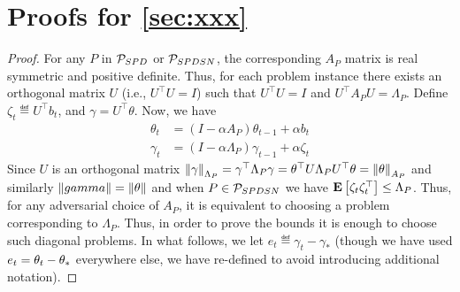 \section{Proofs for \cref{sec:xxx}}

\thpspd*
\begin{proof}
For any $P$ in $\P_{SPD}$ or $\P_{SPDSN}$, the corresponding $A_P$ matrix is real symmetric and positive definite. Thus, for each problem instance there exists an orthogonal matrix $U$ (i.e., $U^\top U=I$) such that $U^\top U=I$ and $U^\top A_P U=\Lambda_P$. Define $\zeta_t\eqdef U^\top b_t$, and $\gamma=U^\top \theta$. Now, we have
\begin{align}
\theta_t&=(I-\alpha A_P)\theta_{t-1}+\alpha b_t\\
\label{eq:gamrec}\gamma_t&=(I-\alpha \Lambda_P)\gamma_{t-1}+\alpha \zeta_t
\end{align}
Since $U$ is an orthogonal matrix $\norm{\gamma}_{\Lambda_P}=\gamma^\top \Lambda_P \gamma= \theta^\top U \Lambda_P U^\top \theta=\norm{\theta}_{A_P}$ and similarly $\norm{gamma}=\norm{\theta}$ and when $P\in \P_{SPDSN}$ we have $\EE{\zeta_t \zeta_t^\top}\leq \Lambda_P$. Thus, for any adversarial choice of $A_P$, it is equivalent to choosing a problem corresponding to $\Lambda_P$. Thus, in order to prove the bounds it is enough to choose such diagonal problems. In what follows, we let $e_t\eqdef\gamma_t-\gamma_*$ (though we have used $e_t=\theta_t-\ts$ everywhere else, we have re-defined to avoid introducing additional notation).


\end{proof}
